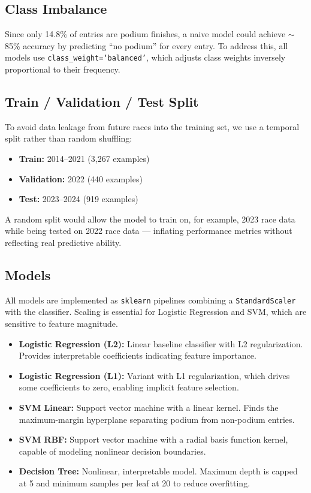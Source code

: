 \documentclass[11pt]{article}
\begin{document}
\subsection{Class Imbalance}
 
Since only 14.8\% of entries are podium finishes, a naive model could achieve $\sim$85\% accuracy by predicting ``no podium'' for every entry. To address this, all models use \texttt{class\_weight=`balanced'}, which adjusts class weights inversely proportional to their frequency.
 
\subsection{Train / Validation / Test Split}
 
To avoid data leakage from future races into the training set, we use a temporal split rather than random shuffling:
 
\begin{itemize}
    \item \textbf{Train:} 2014--2021 (3,267 examples)
    \item \textbf{Validation:} 2022 (440 examples)
    \item \textbf{Test:} 2023--2024 (919 examples)
\end{itemize}
 
A random split would allow the model to train on, for example, 2023 race data while being tested on 2022 race data — inflating performance metrics without reflecting real predictive ability.
 
\subsection{Models}
 
All models are implemented as \texttt{sklearn} pipelines combining a \texttt{StandardScaler} with the classifier. Scaling is essential for Logistic Regression and SVM, which are sensitive to feature magnitude.
 
\begin{itemize}
    \item \textbf{Logistic Regression (L2):} Linear baseline classifier with L2 regularization. Provides interpretable coefficients indicating feature importance.
    \item \textbf{Logistic Regression (L1):} Variant with L1 regularization, which drives some coefficients to zero, enabling implicit feature selection.
    \item \textbf{SVM Linear:} Support vector machine with a linear kernel. Finds the maximum-margin hyperplane separating podium from non-podium entries.
    \item \textbf{SVM RBF:} Support vector machine with a radial basis function kernel, capable of modeling nonlinear decision boundaries.
    \item \textbf{Decision Tree:} Nonlinear, interpretable model. Maximum depth is capped at 5 and minimum samples per leaf at 20 to reduce overfitting.
\end{itemize}
 
\end{document}
